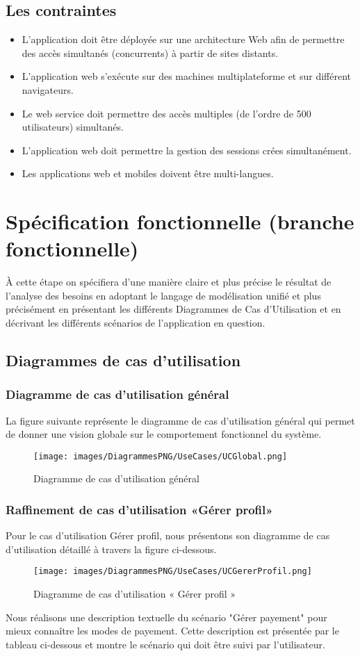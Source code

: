 {\subsection{Les contraintes}
\begin{itemize}
\item L'application doit être déployée sur une architecture Web afin de permettre des accès simultanés (concurrents) à partir de sites distants.
\item L'application web s'exécute sur des machines multiplateforme et sur différent navigateurs.
\item Le web service doit permettre des accès multiples (de l'ordre de 500 utilisateurs) simultanés.
\item L'application web doit permettre la gestion des sessions crées simultanément.
\item Les applications web et mobiles doivent être multi-langues.
\end{itemize}

\section{Spécification fonctionnelle (branche fonctionnelle)}
À cette étape on spécifiera d'une manière claire et plus précise le résultat de l'analyse des besoins en adoptant le langage de modélisation unifié et plus précisément en présentant les différents Diagrammes de Cas d'Utilisation et en décrivant les différents scénarios de l'application en question.
\subsection{Diagrammes de cas d'utilisation}
\subsubsection{Diagramme de cas d'utilisation général}
La figure suivante représente le diagramme de cas d'utilisation général qui permet de donner une vision globale sur le comportement fonctionnel du système.
\begin{figure}[H]
\centering
\texttt{[image: images/DiagrammesPNG/UseCases/UCGlobal.png]}
\caption{Diagramme de cas d'utilisation général}
\end{figure}

\subsubsection{Raffinement de cas d'utilisation «Gérer profil»}
Pour le cas d'utilisation Gérer profil, nous présentons son diagramme de cas d'utilisation détaillé à travers la figure ci-dessous.
\begin{figure}[H]
\centering
\texttt{[image: images/DiagrammesPNG/UseCases/UCGererProfil.png]}
\caption{Diagramme de cas d'utilisation « Gérer profil »}
\end{figure}
Nous réalisons une description textuelle du scénario "Gérer payement" pour mieux connaître les modes de payement. Cette description est présentée par le tableau ci-dessous et montre le scénario qui doit être suivi par l'utilisateur.

}

